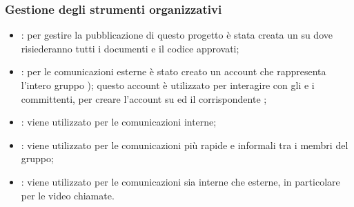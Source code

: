 \subsubsection{Gestione degli strumenti organizzativi}
\begin{itemize}
	\item \textbf{}: per gestire la pubblicazione di questo progetto è stata creata un  su  dove risiederanno tutti i documenti e il codice approvati;
	\item \textbf{}: per le comunicazioni esterne è stato creato un account  che rappresenta l’intero gruppo \Mail{}); questo account è utilizzato per interagire con gli
 e i committenti, per creare l’account su  ed il corrispondente ;
	\item \textbf{}: viene utilizzato per le comunicazioni interne;
	\item \textbf{}: viene utilizzato per le comunicazioni più rapide e informali tra i membri del
gruppo;
	\item \textbf{}: viene utilizzato per le comunicazioni sia interne che esterne, in particolare per le video chiamate.
\end{itemize}
